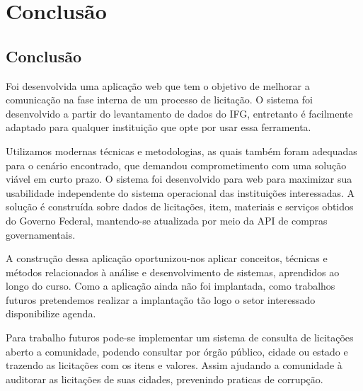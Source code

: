\chapter[Conclusão]{Conclusão}\label{Capitulo6}

\section{Conclusão}

Foi desenvolvida uma aplicação web que tem o objetivo de melhorar a comunicação na fase interna de um processo de licitação.
O sistema foi desenvolvido a partir do levantamento de dados do IFG, entretanto é facilmente adaptado para qualquer instituição que opte por usar essa ferramenta. 

Utilizamos modernas técnicas e metodologias, as quais também foram adequadas para o cenário encontrado, que demandou comprometimento com uma solução viável em curto prazo.
O sistema foi desenvolvido para web para maximizar sua usabilidade independente do sistema operacional das instituições interessadas.
A solução é construída sobre dados de licitações, item, materiais e serviços obtidos do Governo Federal, mantendo-se atualizada por meio da API de compras governamentais.

A construção dessa aplicação oportunizou-nos aplicar conceitos, técnicas e métodos relacionados à análise e desenvolvimento de sistemas, aprendidos ao longo do curso.
Como a aplicação ainda não foi implantada, como trabalhos futuros pretendemos realizar a implantação tão logo o setor interessado disponibilize agenda.

Para trabalho futuros pode-se implementar um sistema de consulta de licitações aberto a comunidade, podendo consultar por órgão público, cidade ou estado e trazendo as licitações com os itens e valores. Assim ajudando a comunidade à auditorar as licitações de suas cidades, prevenindo praticas de corrupção. 